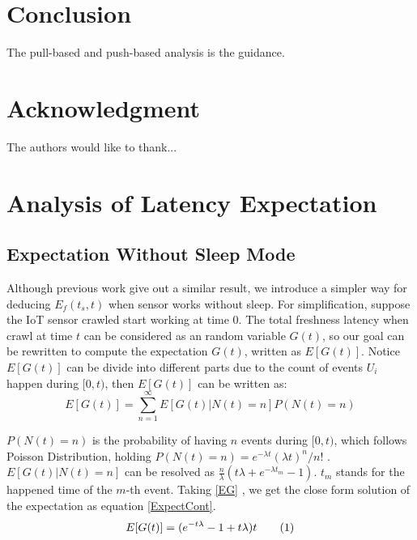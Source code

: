 \documentclass[conference]{IEEEtran}
\newcommand\numberthis{\addtocounter{equation}{1}\tag{\theequation}}
\begin{document}
\section{Conclusion}

The pull-based and push-based analysis is the guidance.

\section*{Acknowledgment}


The authors would like to thank...


\ifCLASSOPTIONcaptionsoff
  \newpage
\fi





%
%
%
%

\appendices
\section{Analysis of Latency Expectation}

\subsection{Expectation Without Sleep Mode}
Although previous work\cite{Cho2000} give out a similar result, we introduce a simpler way for deducing $E_f(t_s, t)$ when sensor works without sleep. For simplification, suppose the IoT sensor crawled start working at time $0$. The total freshness latency when crawl at time $t$ can be considered as an random variable $G(t)$, so our goal can be rewritten to compute the expectation $G(t)$, written as $E[G(t)]$. 
Notice $E[G(t)]$ can be divide into different parts due to the count of events $U_i$ happen during $[0, t)$, then $E[G(t)]$ can be written as:
\begin{equation}
E[G(t)] = \sum_{n=1}^{\infty} E[G(t)|N(t)=n]P(N(t)=n) \label{EG}
\end{equation}

$P(N(t)=n)$ is the probability of having $n$ events during $[0,t)$, which follows Poisson Distribution, holding $P(N(t)=n)=e^{-\lambda t}{(\lambda t)^n}/{n!}$ . $E[G(t)|N(t)=n]$ can be resolved as $\frac{n}{\lambda}(t\lambda+e^{-\lambda t_m}-1)$. $t_{m}$ stands for the happened time of the $m$-th event. Taking \eqref{EG} , we get the close form solution of the expectation as equation \eqref{ExpectCont}.
\begin{equation}
E[G(t)] = (e^{-t\lambda}-1+t \lambda)t \numberthis \label{ExpectCont}
\end{equation}
\end{document}
